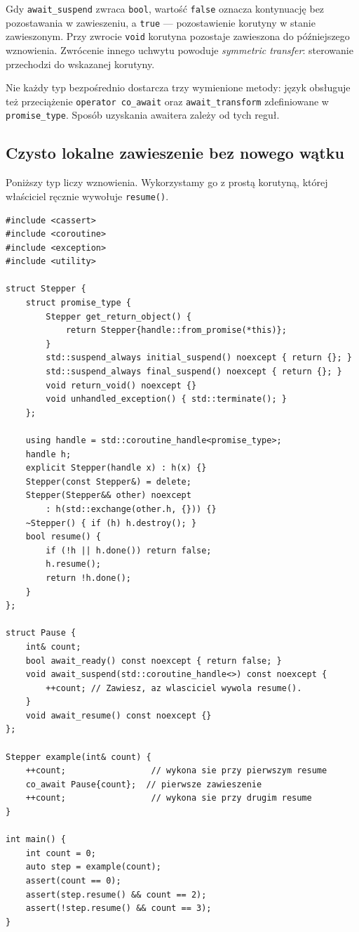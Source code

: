 Gdy \texttt{await\_suspend} zwraca \texttt{bool}, wartość
\texttt{false} oznacza kontynuację bez pozostawania w zawieszeniu,
a \texttt{true} --- pozostawienie korutyny w stanie zawieszonym.
Przy zwrocie \texttt{void} korutyna pozostaje zawieszona do późniejszego
wznowienia. Zwrócenie innego uchwytu powoduje \emph{symmetric transfer}:
sterowanie przechodzi do wskazanej korutyny.

Nie każdy typ bezpośrednio dostarcza trzy wymienione metody: język
obsługuje też przeciążenie \texttt{operator co\_await} oraz
\texttt{await\_transform} zdefiniowane w \texttt{promise\_type}.
Sposób uzyskania awaitera zależy od tych reguł.

\subsection{Czysto lokalne zawieszenie bez nowego wątku}

Poniższy typ liczy wznowienia. Wykorzystamy go z prostą korutyną,
której właściciel ręcznie wywołuje \texttt{resume()}.

\begin{lstlisting}[caption={co\_await z własnym awaiterem: żadnego nowego wątku (C++20); kompletny program.}]
#include <cassert>
#include <coroutine>
#include <exception>
#include <utility>

struct Stepper {
    struct promise_type {
        Stepper get_return_object() {
            return Stepper{handle::from_promise(*this)};
        }
        std::suspend_always initial_suspend() noexcept { return {}; }
        std::suspend_always final_suspend() noexcept { return {}; }
        void return_void() noexcept {}
        void unhandled_exception() { std::terminate(); }
    };

    using handle = std::coroutine_handle<promise_type>;
    handle h;
    explicit Stepper(handle x) : h(x) {}
    Stepper(const Stepper&) = delete;
    Stepper(Stepper&& other) noexcept
        : h(std::exchange(other.h, {})) {}
    ~Stepper() { if (h) h.destroy(); }
    bool resume() {
        if (!h || h.done()) return false;
        h.resume();
        return !h.done();
    }
};

struct Pause {
    int& count;
    bool await_ready() const noexcept { return false; }
    void await_suspend(std::coroutine_handle<>) const noexcept {
        ++count; // Zawiesz, az wlasciciel wywola resume().
    }
    void await_resume() const noexcept {}
};

Stepper example(int& count) {
    ++count;                 // wykona sie przy pierwszym resume
    co_await Pause{count};  // pierwsze zawieszenie
    ++count;                 // wykona sie przy drugim resume
}

int main() {
    int count = 0;
    auto step = example(count);
    assert(count == 0);
    assert(step.resume() && count == 2);
    assert(!step.resume() && count == 3);
}
\end{lstlisting}

